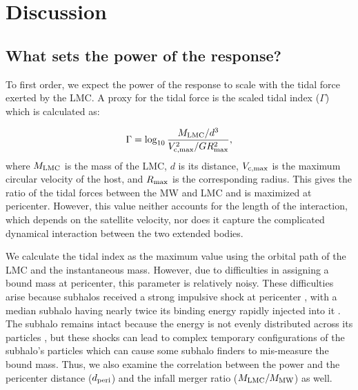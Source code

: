 \documentclass[twocolumn, linenumbers]{openjournal}
\begin{document}


\section{Discussion}

\subsection{What sets the power of the response?} \label{sec:power}


To first order, we expect the power of the response to scale with the tidal force exerted by 
the LMC. A proxy for the tidal force is the scaled tidal index ($\Gamma$) which is calculated as:

\begin{equation}
    \Gamma = \log_{10} \frac{M_{\rm LMC}/d^3}{V_{\rm c,max}^2/GR_{\rm max}^2},
\end{equation}
where $M_{\rm LMC}$ is the mass of the LMC, $d$ is its distance, $V_{\rm c,max}$ is the maximum 
circular velocity of the host, and $R_{\rm max}$ is the corresponding radius. This gives the ratio 
of the tidal forces between the MW and LMC and is maximized at pericenter. However, this value 
neither accounts for the length of the interaction, which depends on the satellite velocity, 
nor does it capture the complicated dynamical interaction between the two extended bodies. 

We calculate the tidal index as the maximum value using the orbital path of the LMC and the 
instantaneous mass. However, due to difficulties in assigning a bound mass at pericenter, 
this parameter is relatively noisy. These difficulties arise because subhalos received a strong 
impulsive shock at pericenter \citep{gnedin_1999}, with a median subhalo having nearly twice its 
binding energy rapidly injected into it \citep{vdb_ogiya_2018}. The subhalo remains intact 
because the energy is not evenly distributed across its particles \citep{vdb_ogiya_2018}, 
but these shocks can lead to complex temporary configurations of the subhalo's particles which 
can cause some subhalo finders to mis-measure the bound mass. Thus, we also examine the correlation 
between the power and the pericenter distance ($d_{\rm peri}$) and the infall merger ratio 
($M_{\rm LMC}/M_{\rm MW}$) as well. 
\end{document}
